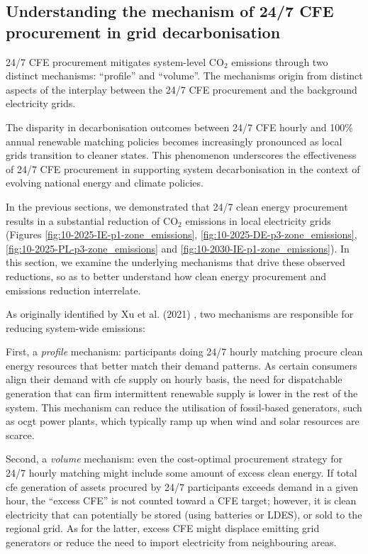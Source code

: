 \subsection{Understanding the mechanism of 24/7 CFE procurement in grid decarbonisation}
\label{subsec:mechanisms}

\begin{res}
    24/7 CFE procurement mitigates system-level CO$_2$ \newline 
    emissions through two distinct mechanisms: \enquote{profile} and \enquote{volume}. The mechanisms origin from distinct aspects of the interplay between the 24/7 CFE procurement and the background electricity grids.
\end{res}

\begin{res}
    The disparity in decarbonisation outcomes between 24/7 CFE hourly and 100\% annual renewable matching policies becomes increasingly pronounced as local grids transition to cleaner states. This phenomenon underscores the effectiveness of 24/7 CFE procurement in supporting system decarbonisation in the context of evolving national energy and climate policies.
\end{res}

In the previous sections, we demonstrated that 24/7 clean energy procurement results in a substantial reduction of CO$_2$ emissions in local electricity grids (Figures \ref{fig:10-2025-IE-p1-zone_emissions}, \ref{fig:10-2025-DE-p3-zone_emissions}, \ref{fig:10-2025-PL-p3-zone_emissions} and \ref{fig:10-2030-IE-p1-zone_emissions}).
In this section, we examine the underlying mechanisms that drive these observed reductions, so as to better understand how clean energy procurement and emissions reduction interrelate.

As originally identified by Xu et al. (2021) \cite{xu-247CFE-report}, two mechanisms are responsible for reducing system-wide emissions:

First, a \textit{profile} mechanism: participants doing 24/7 hourly matching procure clean energy resources that better match their demand patterns. 
As certain consumers align their demand with \gls{cfe} supply on hourly basis, the need for dispatchable generation that can firm intermittent renewable supply is lower in the rest of the system. 
This mechanism can reduce the utilisation of fossil-based generators, such as \gls{ocgt} power plants, which typically ramp up when wind and solar resources are scarce.

Second, a \textit{volume} mechanism: even the cost-optimal procurement strategy for 24/7 hourly matching might include some amount of excess clean energy.
If total \gls{cfe} generation of assets procured by 24/7 participants exceeds demand in a given hour, the \enquote{excess CFE} is not counted toward a CFE target; however, it is clean electricity that can potentially be stored (using batteries or LDES), or sold to the regional grid.
As for the latter, excess CFE might displace emitting grid generators or reduce the need to import electricity from neighbouring areas.

